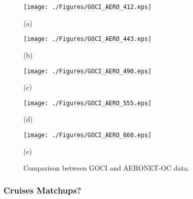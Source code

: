 \documentclass[onecolumn,3p,letterpaper,11pt]{elsarticle}
\begin{document}
\begin{figure}[htb!]
    \begin{minipage}[c]{0.48\linewidth}
      \centering
      \texttt{[image: ./Figures/GOCI\_AERO\_412.eps]}
    \centerline{(a)}\medskip
    \end{minipage}  
    \hfill
    \begin{minipage}[c]{0.48\linewidth}
      \centering
      \texttt{[image: ./Figures/GOCI\_AERO\_443.eps]}
      \centerline{(b)}\medskip
    \end{minipage}  

  \begin{minipage}[c]{0.48\linewidth}
      \centering
      \texttt{[image: ./Figures/GOCI\_AERO\_490.eps]}
    \centerline{(c)}\medskip
    \end{minipage}  
    \hfill
    \begin{minipage}[c]{0.48\linewidth}
      \centering
      \texttt{[image: ./Figures/GOCI\_AERO\_555.eps]}
      \centerline{(d)}\medskip
    \end{minipage}  

  \begin{minipage}[c]{1.0\linewidth}
      \centering
      \texttt{[image: ./Figures/GOCI\_AERO\_660.eps]}
      \centerline{(e)}\medskip
    \end{minipage}   

    \caption{Comparison between GOCI and AERONET-OC data. \label{fig:GOCI_AERO} } 
\end{figure}
\subsubsection{Cruises Matchups?}

\end{document}
